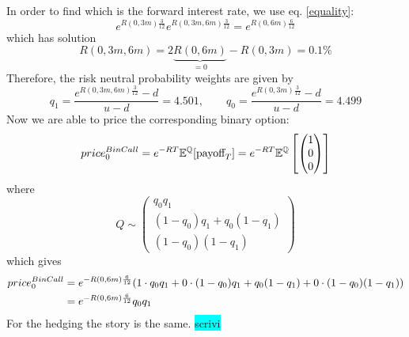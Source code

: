 In order to find which is the forward interest rate, we use eq. \eqref{equality}:
\begin{equation}\label{equality1}
    e^{R\left(0,3m\right)\frac{3}{12}}e^{R\left(0,3m,6m\right)\frac{3}{12}} = e^{R(0,6m)\frac{6}{12}}
\end{equation}
which has solution
\begin{equation}
    R\left(0,3m,6m\right) = 2\underbrace{R(0,6m)}_{=0}-R\left(0,3m\right) = 0.1\%
\end{equation}
Therefore, the risk neutral probability weights are given by
\begin{equation}
    q_1 = \dfrac{e^{R\left(0,3m,6m\right)\frac{3}{12}}-d}{u-d} = 4.501, \qquad q_0 = \dfrac{e^{R\left(0,3m\right)\frac{3}{12}}-d}{u-d} = 4.499
\end{equation}
Now we are able to price the corresponding binary option:
\begin{equation}
    price_0^{BinCall} = e^{-RT}\mathbb{E}^{\mathbb{Q}}[\mbox{payoff}_T] = e^{-RT}\mathbb{E}^{\mathbb{Q}}\left[
    \left( 
    \begin{matrix}
    1 \\ 0 \\ 0
    \end{matrix}
    \right)
    \right]
\end{equation}
where
\begin{equation}
    Q \sim \left(
    \begin{matrix}
    q_0q_1 \\ (1-q_0)q_1+q_0(1-q_1) \\ (1-q_0)(1-q_1)
    \end{matrix}
    \right)
\end{equation}
which gives
\begin{align}
    \notag price_0^{BinCall} 
    &= 
    \notag e^{-R(0,6m)\frac{6}{12}}(1\cdot q_0q_1 + 0\cdot (1-q_0)q_1+q_0(1-q_1) + 0\cdot (1-q_0)(1-q_1)) \\
    &=
    e^{-R(0,6m)\frac{6}{12}}q_0q_1
\end{align}
For the hedging the story is the same. \colorbox{cyan}{scrivi}

